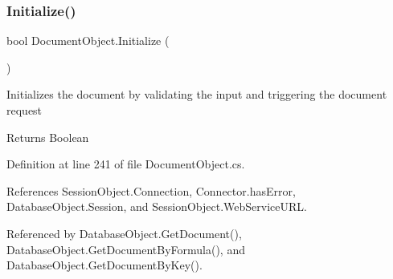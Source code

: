 \subsubsection{\texorpdfstring{Initialize()}{Initialize()}}
{\footnotesize\ttfamily bool Document\+Object.\+Initialize (\begin{DoxyParamCaption}{ }\end{DoxyParamCaption})}



Initializes the document by validating the input and triggering the document request 

\begin{DoxyReturn}{Returns}
Boolean
\end{DoxyReturn}


Definition at line 241 of file Document\+Object.\+cs.



References Session\+Object.\+Connection, Connector.\+has\+Error, Database\+Object.\+Session, and Session\+Object.\+Web\+Service\+U\+RL.



Referenced by Database\+Object.\+Get\+Document(), Database\+Object.\+Get\+Document\+By\+Formula(), and Database\+Object.\+Get\+Document\+By\+Key().



